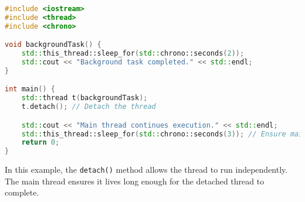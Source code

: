 \begin{lstlisting}[language=C++]
#include <iostream>
#include <thread>
#include <chrono>

void backgroundTask() {
    std::this_thread::sleep_for(std::chrono::seconds(2));
    std::cout << "Background task completed." << std::endl;
}

int main() {
    std::thread t(backgroundTask);
    t.detach(); // Detach the thread

    std::cout << "Main thread continues execution." << std::endl;
    std::this_thread::sleep_for(std::chrono::seconds(3)); // Ensure main thread lives long enough
    return 0;
}
\end{lstlisting}

In this example, the \texttt{detach()} method allows the thread to run independently.
The main thread ensures it lives long enough for the detached thread to complete.